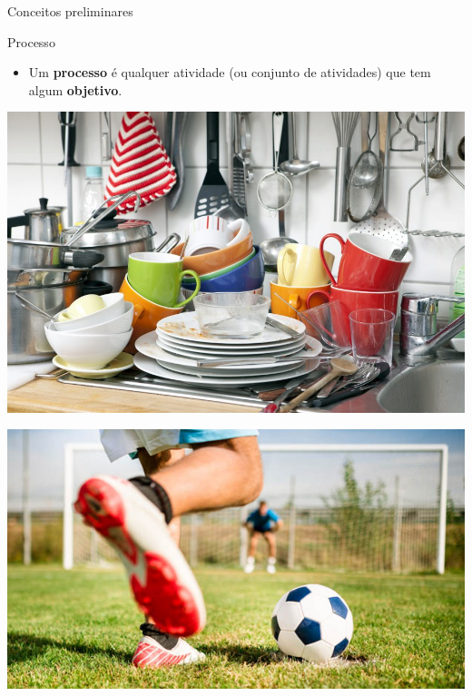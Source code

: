 \begin{frame}{Conceitos preliminares}
	\begin{block}{Processo}
		\begin{itemize}
			\item Um \textbf{processo} é qualquer atividade (ou conjunto de atividades) que tem algum \textbf{objetivo}.
		\end{itemize}
	\end{block}

	\vspace{0.5cm}

	\begin{minipage}{0.49\linewidth}
		\centering
		\includegraphics[width=1\linewidth]{Figuras/Ch11/fig3}
	\end{minipage}
	\hfill
	\begin{minipage}{0.49\linewidth}
		\centering
		\includegraphics[width=1\linewidth]{Figuras/Ch11/fig4}
	\end{minipage}
\end{frame}


